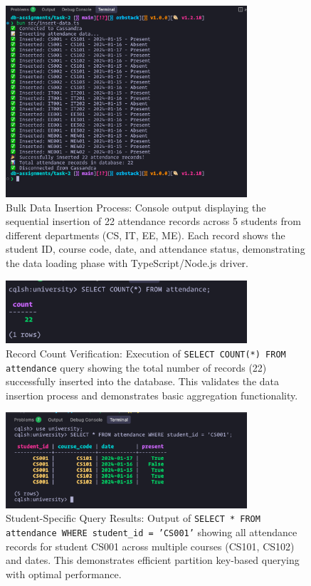 \begin{figure}[H]
  \centering
  \includegraphics[width=0.8\textwidth]{task-2/screenshots/insert-data.png}
  \caption{Bulk Data Insertion Process: Console output displaying the sequential insertion of 22 attendance records across 5 students from different departments (CS, IT, EE, ME). Each record shows the student ID, course code, date, and attendance status, demonstrating the data loading phase with TypeScript/Node.js driver.}
  \label{fig:task2-insert-data}
\end{figure}

\begin{figure}[H]
  \centering
  \includegraphics[width=0.8\textwidth]{task-2/screenshots/count_query.png}
  \caption{Record Count Verification: Execution of \texttt{SELECT COUNT(*) FROM attendance} query showing the total number of records (22) successfully inserted into the database. This validates the data insertion process and demonstrates basic aggregation functionality.}
  \label{fig:task2-count-query}
\end{figure}

\begin{figure}[H]
  \centering
  \includegraphics[width=0.8\textwidth]{task-2/screenshots/select-where_student_id.png}
  \caption{Student-Specific Query Results: Output of \texttt{SELECT * FROM attendance WHERE student\_id = 'CS001'} showing all attendance records for student CS001 across multiple courses (CS101, CS102) and dates. This demonstrates efficient partition key-based querying with optimal performance.}
  \label{fig:task2-select-student}
\end{figure}

